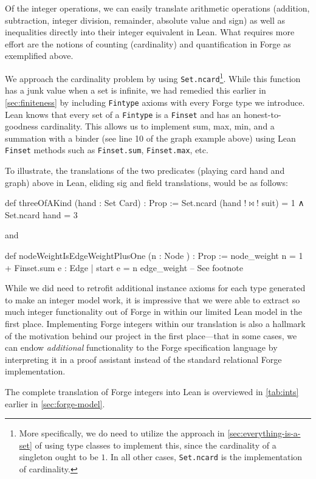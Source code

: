 Of the integer operations, we can easily translate arithmetic operations (addition, subtraction, integer division, remainder, absolute value and sign) as well as inequalities directly into their integer equivalent in Lean. What requires more effort are the notions of counting (cardinality) and quantification in Forge as exemplified above. 

We approach the cardinality problem by using \texttt{Set.ncard}\footnote{More specifically, we do need to utilize the approach in \cref{sec:everything-is-a-set} of using type classes to implement this, since the cardinality of a singleton ought to be $1$. In all other cases, \texttt{Set.ncard} is the implementation of cardinality.}. While this function has a junk value when a set is infinite, we had remedied this earlier in \cref{sec:finiteness} by including \texttt{Fintype} axioms with every Forge type we introduce. Lean knows that every set of a \texttt{Fintype} is a \texttt{Finset} and has an honest-to-goodness cardinality. This allows us to implement sum, max, min, and a summation with a binder (see line 10 of the graph example above) using Lean \texttt{Finset} methods such as \texttt{Finset.sum}, \texttt{Finset.max}, etc. 

To illustrate, the translations of the two predicates (playing card hand and graph) above in Lean, eliding sig and field translations, would be as follows:
\begin{lean*}
def threeOfAKind (hand : Set Card) : Prop :=
  Set.ncard (hand !$\bowtie$! suit) = 1 ∧ Set.ncard hand = 3
\end{lean*}
and 

\begin{lean*}
def nodeWeightIsEdgeWeightPlusOne (n : Node ) : Prop :=
  node_weight n = 1 + Finset.sum { e : Edge | start e = n } edge_weight -- See footnote \footnotemark
\end{lean*}

While we did need to retrofit additional instance axioms for each type generated to make an integer model work, it is impressive that we were able to extract so much integer functionality out of Forge in within our limited Lean model in the first place. Implementing Forge integers within our translation is also a hallmark of the motivation behind our project in the first place---that in some cases, we can endow \emph{additional} functionality to the Forge specification language by interpreting it in a proof assistant instead of the standard relational Forge implementation. 

The complete translation of Forge integers into Lean is overviewed in \cref{tab:ints} earlier in \cref{sec:forge-model}. 